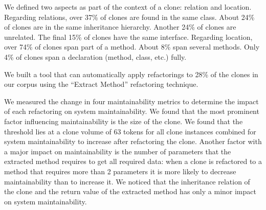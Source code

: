 \documentclass[a4paper,UKenglish,cleveref, autoref, thm-restate,authorcolumns]{lipics-v2019}
\begin{document}
We defined two aspects as part of the context of a clone: relation and location. Regarding relations, over 37\% of clones are found in the same class. About 24\% of clones are in the same inheritance hierarchy. Another 24\% of clones are unrelated. The final 15\% of clones have the same interface. Regarding location, over 74\% of clones span part of a method. About 8\% span several methods. Only 4\% of clones span a declaration (method, class, etc.) fully.

We built a tool that can automatically apply refactorings to 28\% of the clones in our corpus using the ``Extract Method'' refactoring technique. 

We measured the change in four maintainability metrics
to determine the impact of each refactoring on system maintainability. We found that the most prominent factor influencing maintainability is the size of the clone. We found that the threshold lies at a clone volume of 63  %
tokens for all clone instances combined for system maintainability to increase after refactoring the clone. Another factor with a major impact on maintainability is the number of parameters that the extracted method requires to get all required data: when a clone is refactored to a method that requires more than 2 parameters it is more likely to decrease maintainability than to increase it. We noticed that the inheritance relation of the clone and the return value of the extracted method has only a minor impact on system maintainability.



\end{document}
